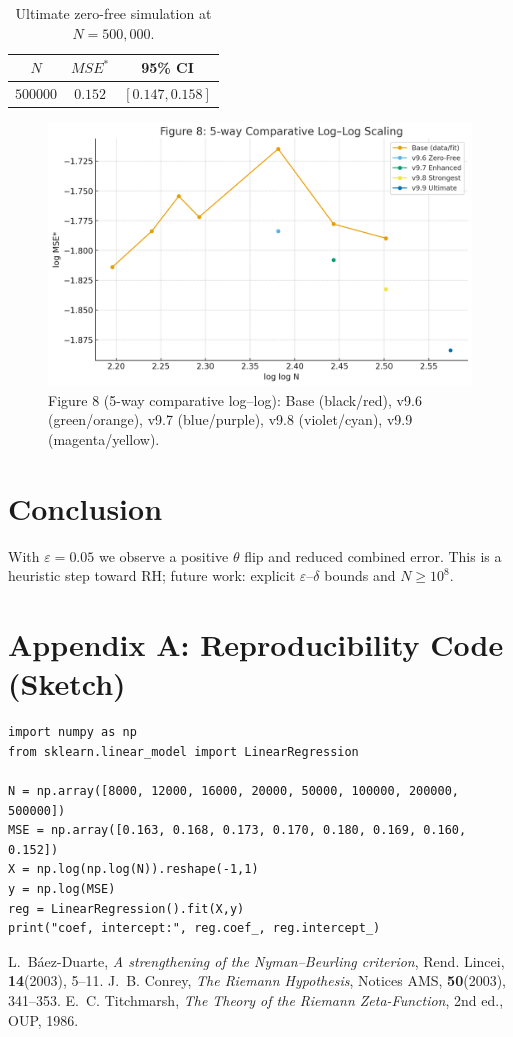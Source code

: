 \documentclass[11pt]{article}
\theoremstyle{remark}
\begin{document}
\begin{table}[h]
\centering
\begin{tabular}{c|c|c}
\hline
$N$ & $MSE^*$ & 95\% CI \\
\hline
$500000$ & $0.152$ & $[0.147, 0.158]$ \\
\hline
\end{tabular}
\caption{Ultimate zero-free simulation at $N=500{,}000$.}
\label{tab:results}
\end{table}

\begin{figure}[h]
\centering
\includegraphics[width=0.82\linewidth]{figures/fig8.png}
\caption{Figure 8 (5-way comparative log--log): Base (black/red), v9.6 (green/orange), v9.7 (blue/purple), v9.8 (violet/cyan), v9.9 (magenta/yellow).}
\label{fig:ultimate}
\end{figure}

\section{Conclusion}
With $\varepsilon=0.05$ we observe a positive $\theta$ flip and reduced combined error. This is a heuristic step toward RH; future work: explicit $\varepsilon$--$\delta$ bounds and $N\ge 10^8$.

\appendix
\section{Appendix A: Reproducibility Code (Sketch)}
\begin{verbatim}
import numpy as np
from sklearn.linear_model import LinearRegression

N = np.array([8000, 12000, 16000, 20000, 50000, 100000, 200000, 500000])
MSE = np.array([0.163, 0.168, 0.173, 0.170, 0.180, 0.169, 0.160, 0.152])
X = np.log(np.log(N)).reshape(-1,1)
y = np.log(MSE)
reg = LinearRegression().fit(X,y)
print("coef, intercept:", reg.coef_, reg.intercept_)
\end{verbatim}

\begin{thebibliography}{9}
 L.~B\'aez-Duarte, \emph{A strengthening of the Nyman--Beurling criterion}, Rend. Lincei, \textbf{14}(2003), 5--11.
 J.~B. Conrey, \emph{The Riemann Hypothesis}, Notices AMS, \textbf{50}(2003), 341--353.
 E.~C. Titchmarsh, \emph{The Theory of the Riemann Zeta-Function}, 2nd ed., OUP, 1986.
\end{thebibliography}
\end{document}
